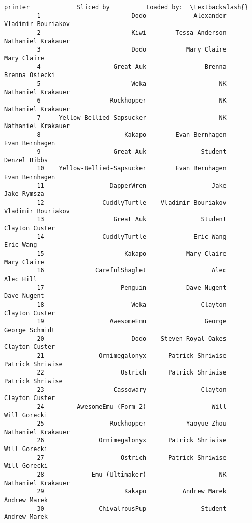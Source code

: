 \documentclass[11pt]{article}
\begin{document}
\begin{Verbatim}[commandchars=\\\{\}]
                                printer             Sliced by          Loaded by:  \textbackslash{}
         1                         Dodo             Alexander  Vladimir Bouriakov   
         2                         Kiwi        Tessa Anderson  Nathaniel Krakauer   
         3                         Dodo           Mary Claire         Mary Claire   
         4                    Great Auk                Brenna      Brenna Osiecki   
         5                         Weka                    NK  Nathaniel Krakauer   
         6                   Rockhopper                    NK  Nathaniel Krakauer   
         7     Yellow-Bellied-Sapsucker                    NK  Nathaniel Krakauer   
         8                       Kakapo        Evan Bernhagen      Evan Bernhagen   
         9                    Great Auk               Student        Denzel Bibbs   
         10    Yellow-Bellied-Sapsucker        Evan Bernhagen      Evan Bernhagen   
         11                  DapperWren                  Jake         Jake Rymsza   
         12                CuddlyTurtle    Vladimir Bouriakov  Vladimir Bouriakov   
         13                   Great Auk               Student      Clayton Custer   
         14                CuddlyTurtle             Eric Wang           Eric Wang   
         15                      Kakapo           Mary Claire         Mary Claire   
         16              CarefulShaglet                  Alec           Alec Hill   
         17                     Penguin           Dave Nugent         Dave Nugent   
         18                        Weka               Clayton      Clayton Custer   
         19                  AwesomeEmu                George      George Schmidt   
         20                        Dodo    Steven Royal Oakes      Clayton Custer   
         21               Ornimegalonyx      Patrick Shriwise    Patrick Shriwise   
         22                     Ostrich      Patrick Shriwise    Patrick Shriwise   
         23                   Cassowary               Clayton      Clayton Custer   
         24         AwesomeEmu (Form 2)                  Will        Will Gorecki   
         25                  Rockhopper           Yaoyue Zhou  Nathaniel Krakauer   
         26               Ornimegalonyx      Patrick Shriwise        Will Gorecki   
         27                     Ostrich      Patrick Shriwise        Will Gorecki   
         28             Emu (Ultimaker)                    NK  Nathaniel Krakauer   
         29                      Kakapo          Andrew Marek        Andrew Marek   
         30               ChivalrousPup               Student        Andrew Marek   

\end{Verbatim}
\end{document}
